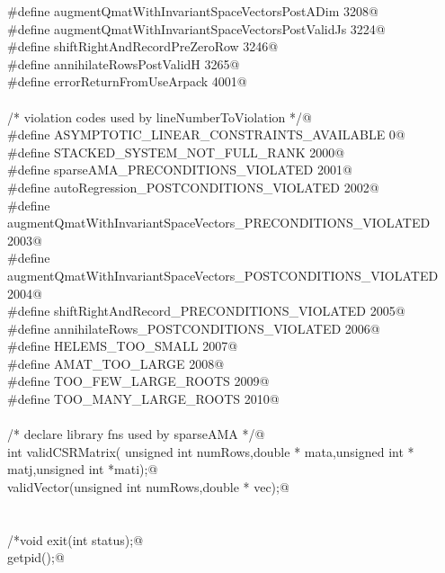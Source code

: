 \documentclass[12pt]{article}
\begin{document}
\begin{flushleft}
\begin{minipage}{\linewidth}
\begin{list}{}{}
\mbox{}\verb@#define augmentQmatWithInvariantSpaceVectorsPostADim 3208@\\
\mbox{}\verb@#define augmentQmatWithInvariantSpaceVectorsPostValidJs 3224@\\
\mbox{}\verb@#define shiftRightAndRecordPreZeroRow 3246@\\
\mbox{}\verb@#define annihilateRowsPostValidH 3265@\\
\mbox{}\verb@#define errorReturnFromUseArpack 4001@\\
\mbox{}\verb@@\\
\mbox{}\verb@/* violation codes used by lineNumberToViolation */@\\
\mbox{}\verb@#define ASYMPTOTIC_LINEAR_CONSTRAINTS_AVAILABLE 0@\\
\mbox{}\verb@#define STACKED_SYSTEM_NOT_FULL_RANK 2000@\\
\mbox{}\verb@#define sparseAMA_PRECONDITIONS_VIOLATED 2001@\\
\mbox{}\verb@#define autoRegression_POSTCONDITIONS_VIOLATED 2002@\\
\mbox{}\verb@#define augmentQmatWithInvariantSpaceVectors_PRECONDITIONS_VIOLATED 2003@\\
\mbox{}\verb@#define augmentQmatWithInvariantSpaceVectors_POSTCONDITIONS_VIOLATED 2004@\\
\mbox{}\verb@#define shiftRightAndRecord_PRECONDITIONS_VIOLATED 2005@\\
\mbox{}\verb@#define annihilateRows_POSTCONDITIONS_VIOLATED 2006@\\
\mbox{}\verb@#define HELEMS_TOO_SMALL 2007@\\
\mbox{}\verb@#define AMAT_TOO_LARGE 2008@\\
\mbox{}\verb@#define TOO_FEW_LARGE_ROOTS 2009@\\
\mbox{}\verb@#define TOO_MANY_LARGE_ROOTS 2010@\\
\mbox{}\verb@@\\
\mbox{}\verb@/* declare library fns used by sparseAMA */@\\
\mbox{}\verb@unsigned int validCSRMatrix( unsigned int numRows,double * mata,unsigned int * matj,unsigned int *mati);@\\
\mbox{}\verb@int validVector(unsigned int numRows,double * vec);@\\
\mbox{}\verb@@\\
\mbox{}\verb@@\\
\mbox{}\verb@/*void exit(int status);@\\
\mbox{}\verb@long getpid();@\\

\end{list}
\end{minipage}
\end{flushleft}
\end{document}
